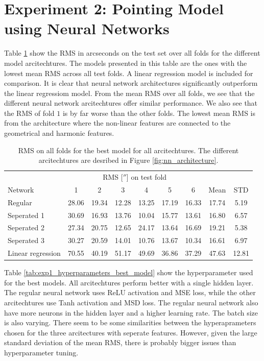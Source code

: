 \section{Experiment 2: Pointing Model using Neural Networks}

Table \ref{tab:exp1_rms_folds_best_model} show the RMS in arcseconds on the test set over all folds for the different model arcitechtures.
The models presented in this table are the ones with the lowest mean RMS across all test folds.
A linear regression model is included for comparison. 
It is clear that neural network architectures significantly outperform the linear regressiom model.
From the mean RMS over all folds, we see that the different neural network arcitechtures offer similar performance.
We also see that the RMS of fold $1$ is by far worse than the other folds.
The lowest mean RMS is from the architecture where the non-linear features are connected to the geometrical and harmonic features.\\

\begin{table}[!htbp]
    \centering
    \caption{RMS on all folds for the best model for all arcitechtures. The different arcitechtures are desribed in Figure \ref{fig:nn_architecture}.}
    \begin{tabular}{lcccccccc}
        \toprule
        & \multicolumn{6}{c}{RMS [$''$] on test fold} & & \\
        \cmidrule(lr){2-7}
        Network & 1 & 2 & 3 & 4 & 5 & 6 & Mean & STD\\
        \midrule
        Regular           & 28.06 & 19.34 & 12.28 & 13.25 & 17.19 & 16.33 & 17.74 & 5.19 \\
        Seperated 1       & 30.69 & 16.93 & 13.76 & 10.04 & 15.77 & 13.61 & 16.80 & 6.57 \\
        Seperated 2       & 27.34 & 20.75 & 12.65 & 24.17 & 13.64 & 16.69 & 19.21 & 5.38 \\
        Seperated 3       & 30.27 & 20.59 & 14.01 & 10.76 & 13.67 & 10.34 & 16.61 & 6.97 \\
        Linear regression & 70.55 & 40.19 & 51.17 & 49.69 & 36.86 & 37.29 & 47.63 & 12.81 \\
        \bottomrule
    \end{tabular}
    \label{tab:exp1_rms_folds_best_model}
\end{table}


Table \ref{tab:exp1_hyperparameters_best_model} show the hyperparameter used for the best models.
All arcitechtures perform better with a single hidden layer.
The regular neural network uses ReLU activation and MSE loss, while the other arcitechtures use Tanh activation and MSD loss.
The regular neural network also have more neurons in the hidden layer and a higher learning rate.
The batch size is also varying. There seem to be some similarities between the hyperaprameters chosen for the three arcitectures with seperate features.
However, given the large standard deviation of the mean RMS, there is probably bigger issues than hyperparameter tuning.\\

